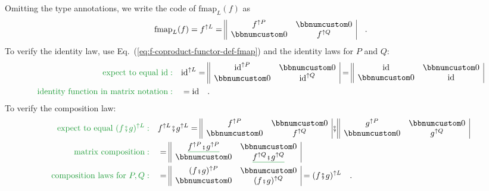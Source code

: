 Omitting the type annotations, we write the code of $\text{fmap}_{L}(f)$
as
\begin{equation}
\text{fmap}_{L}(f)=f^{\uparrow L}=\begin{array}{||cc|}
f^{\uparrow P} & \bbnum 0\\
\bbnum 0 & f^{\uparrow Q}
\end{array}\quad.\label{eq:f-coproduct-functor-def-fmap}
\end{equation}
To verify the identity law, use Eq.~(\ref{eq:f-coproduct-functor-def-fmap})
and the identity laws for $P$ and $Q$:
\begin{align*}
{\color{greenunder}\text{expect to equal }\text{id}:}\quad & \text{id}^{\uparrow L}=\begin{array}{||cc|}
\text{id}^{\uparrow P} & \bbnum 0\\
\bbnum 0 & \text{id}^{\uparrow Q}
\end{array}=\begin{array}{||cc|}
\text{id} & \bbnum 0\\
\bbnum 0 & \text{id}
\end{array}\\
{\color{greenunder}\text{identity function in matrix notation}:}\quad & =\text{id}\quad.
\end{align*}
To verify the composition law:
\begin{align*}
{\color{greenunder}\text{expect to equal }(f\bef g)^{\uparrow L}:}\quad & f^{\uparrow L}\bef g^{\uparrow L}=\begin{array}{||cc|}
f^{\uparrow P} & \bbnum 0\\
\bbnum 0 & f^{\uparrow Q}
\end{array}\bef\begin{array}{||cc|}
g^{\uparrow P} & \bbnum 0\\
\bbnum 0 & g^{\uparrow Q}
\end{array}\\
{\color{greenunder}\text{matrix composition}:}\quad & =\begin{array}{||cc|}
\gunderline{f^{\uparrow P}\bef g^{\uparrow P}} & \bbnum 0\\
\bbnum 0 & \gunderline{f^{\uparrow Q}\bef g^{\uparrow Q}}
\end{array}\\
{\color{greenunder}\text{composition laws for }P,Q:}\quad & =\begin{array}{||cc|}
(f\bef g)^{\uparrow P} & \bbnum 0\\
\bbnum 0 & (f\bef g)^{\uparrow Q}
\end{array}=(f\bef g)^{\uparrow L}\quad.
\end{align*}

